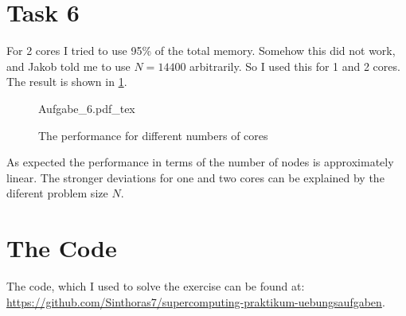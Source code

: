 \documentclass[a4paper,12pt,DIV=15, english, parskip=half]{scrartcl}  %
\newcommand{\inkfig}[2][\columnwidth]{%
    \def\svgwidth{#1}
    {#2.pdf_tex}
}
\numberwithin{equation}{section}
\begin{document}
\section*{Task 6}
\label{sec:task-6}

For 2 cores I tried to use 95\% of the total memory. Somehow this did not work, and Jakob told me to use \(N=14400\) arbitrarily. So I used this for 1 and 2 cores. The result is shown in \cref{fig:aufgabe-6}.


\begin{figure}[h!]
  \centering
  \inkfig{Aufgabe_6}
  \caption{The performance for different numbers of cores}
  \label{fig:aufgabe-6}
\end{figure}

As expected the performance in terms of the number of nodes is approximately linear. The stronger deviations for one and two cores can be explained by the diferent problem size \(N\).



\section*{The Code}
\label{sec:code}



The code, which I used to solve the exercise can be found at: \url{https://github.com/Sinthoras7/supercomputing-praktikum-uebungsaufgaben}.
\end{document}
